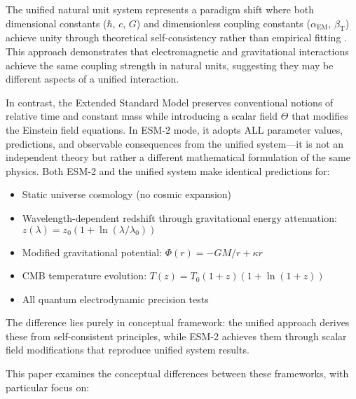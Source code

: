\documentclass[12pt,a4paper]{article}
\newcommand{\alphaEM}{\alpha_{\text{EM}}}
\newcommand{\betaT}{\beta_{\text{T}}}
\begin{document}
	The unified natural unit system represents a paradigm shift where both dimensional constants ($\hbar$, $c$, $G$) and dimensionless coupling constants ($\alphaEM$, $\betaT$) achieve unity through theoretical self-consistency rather than empirical fitting \cite{pascher_beta_derivation_2025}. This approach demonstrates that electromagnetic and gravitational interactions achieve the same coupling strength in natural units, suggesting they may be different aspects of a unified interaction.
	
	In contrast, the Extended Standard Model preserves conventional notions of relative time and constant mass while introducing a scalar field $\Theta$ that modifies the Einstein field equations. In ESM-2 mode, it adopts ALL parameter values, predictions, and observable consequences from the unified system—it is not an independent theory but rather a different mathematical formulation of the same physics. Both ESM-2 and the unified system make identical predictions for:
	
	\begin{itemize}
		\item Static universe cosmology (no cosmic expansion)
		\item Wavelength-dependent redshift through gravitational energy attenuation: $z(\lambda) = z_0(1 + \ln(\lambda/\lambda_0))$
		\item Modified gravitational potential: $\Phi(r) = -GM/r + \kappa r$
		\item CMB temperature evolution: $T(z) = T_0(1+z)(1+\ln(1+z))$
		\item All quantum electrodynamic precision tests \cite{pascher_muon_g2_2025}
	\end{itemize}
	
	The difference lies purely in conceptual framework: the unified approach derives these from self-consistent principles, while ESM-2 achieves them through scalar field modifications that reproduce unified system results.
	
	This paper examines the conceptual differences between these frameworks, with particular focus on:
	
\end{document}
